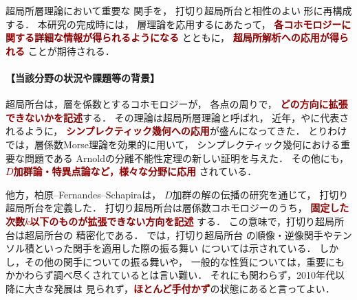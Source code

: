 \documentclass[10pt,a4paper,uplatex,dvipdfmx]{ujarticle} 		%
\newcommand{\研究課題名}{打切り超局所台の関手的性質の研究とMorse理論への応用}
\newcommand{\研究機関名}{北海道大学}
\newcommand{\研究代表者氏名}{大柴寿浩}
\begin{document}
超局所層理論において重要な
関手を，
打切り超局所台と相性のよい
形に再構成する．%
本研究の完成時には，
層理論を応用するにあたって，
\textcolor{darkred}{
	\textbf{%
		各コホモロジーに関する詳細な情報が得られるようになる}%
}とともに，
\textcolor{darkred}{
	\textbf{超局所解析への応用が得られる}
}ことが期待される．
\vspace{-16pt}
\paragraph{【当該分野の状況や課題等の背景】}
超局所台は，層を係数とするコホモロジーが，
各点の周りで，
\textcolor{darkred}{\textbf{どの方向に拡張できないかを記述}}する．
その理論は超局所層理論と呼ばれ，
近年，\cite{Nad09,NZ09}や\cite{Tam18}に代表されるように，
\textcolor{darkred}{\textbf{シンプレクティック幾何への応用}}が盛んになってきた．
とりわけ\cite{GKS12}では，層係数Morse理論を効果的に用いて，
シンプレクティック幾何における重要な問題である
Arnoldの分離不能性定理の新しい証明を与えた．
その他にも，\textcolor{darkred}{
	\textbf{\(D\)加群論・特異点論など，様々な分野に応用}
}されている．

他方，柏原--Fernandes--Schapira\cite{KMS03}は，
\(D\)加群の解の伝播の研究を通じて，
打切り超局所台を定義した．
打切り超局所台は層係数コホモロジーのうち，\textcolor{darkred}{
	\textbf{固定した次数\(k\)以下のものが拡張できない方向を記述}
}する．
この意味で，打切り超局所台は超局所台の
精密化である．
\cite{KMS03}では，打切り超局所台
の順像・逆像関手やテンソル積といった関手を適用した際の振る舞い
については示されている．%
しかし，その他の関手についての振る舞いや，
一般的な性質については，重要にもかかわらず調べ尽くされているとは言い難い．
それにも関わらず，2010年代以降に大きな発展は
見られず，\textcolor{darkred}{\textbf{ほとんど手付かず}}の状態にあると言ってよい．
\end{document}

